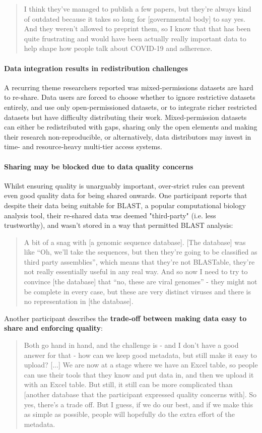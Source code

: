 \documentclass{CUP-JNL-DAP}%
\begin{document}
\blockquote{I think they've managed to publish a few papers, but they're always kind of outdated because it takes so long for [governmental body] to say yes. And they weren't allowed to preprint them, so I know that that has been quite frustrating and would have been actually really important data to help shape how people talk about COVID-19 and adherence.}

\paragraph{Data integration results in redistribution challenges}
A recurring theme researchers reported was mixed-permissions datasets are hard to re-share. Data users are forced to choose whether to ignore restrictive datasets entirely, and use only open-permissioned datasets, or to integrate richer restricted datasets but have difficulty distributing their work. Mixed-permission datasets can either be redistributed with gaps, sharing only the open elements and making their research non-reproducible, or alternatively, data distributors may invest in time- and resource-heavy multi-tier access systems. 

\paragraph{Sharing may be blocked due to data quality concerns}
Whilst ensuring quality is unarguably important, over-strict rules can prevent even good quality data for being shared onwards. One participant reports that despite their data being suitable for BLAST, a popular computational biology analysis tool, their re-shared data was deemed "third-party" (i.e. less trustworthy), and wasn't stored in a way that permitted BLAST analysis: 

\blockquote{A bit of a snag with [a genomic sequence database]. [The database] was like \enquote{Oh, we'll take the sequences, but then they're going to be classified as third party assemblies}, which means that they're not BLASTable, they're not really essentially useful in any real way. And so now I need to try to convince [the database] that \enquote{no, these are viral genomes} - they might not be complete in every case, but these are very distinct viruses and there is no representation in [the database].}

Another participant describes the \textbf{trade-off between making data easy to share and enforcing quality}: 
\blockquote{Both go hand in hand, and the challenge is - and I don't have a good answer for that - how can we keep good metadata, but still make it easy to upload? [...]  We are now at a stage where we have an Excel table, so people can use their tools that they know and put data in, and then we upload it with an Excel table. But still, it still can be more complicated than [another database that the participant expressed quality concerns with]. So yes, there's a trade off. But I guess, if we do our best, and if we make this as simple as possible, people will hopefully do the extra effort of the metadata.}
\end{document}
